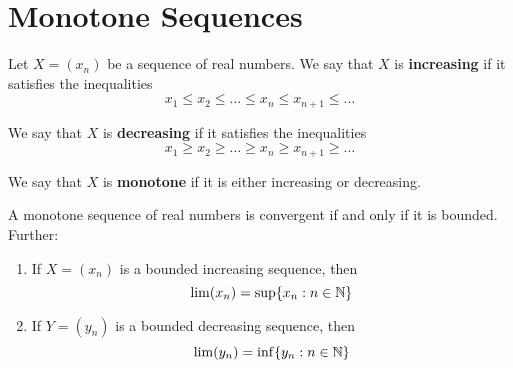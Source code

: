 \section{Monotone Sequences}

\begin{definition}
	Let $X=(x_n)$ be a sequence of real numbers. We say that $X$ is \textbf{increasing} if it satisfies the inequalities
	\[x_1 \leq x_2 \leq \dots \leq x_n \leq x_{n+1} \leq \dots\]

	We say that $X$ is \textbf{decreasing} if it satisfies the inequalities
	\[x_1 \geq x_2 \geq \dots \geq x_n \geq x_{n+1} \geq \dots\]

	We say that $X$ is \textbf{monotone} if it is either increasing or decreasing.
\end{definition}

\begin{theorem}
	A monotone sequence of real numbers is convergent if and only if it is bounded. Further:
	\begin{enumerate}
		\item If $X=(x_n)$ is a bounded increasing sequence, then
		      \[\lim (x_n) = \sup \{x_n : n \in \mathbb{N}\}\]

		\item If $Y=(y_n)$ is a bounded decreasing sequence, then
		      \[\lim (y_n) = \inf \{y_n : n \in \mathbb{N}\}\]
	\end{enumerate}
\end{theorem}
